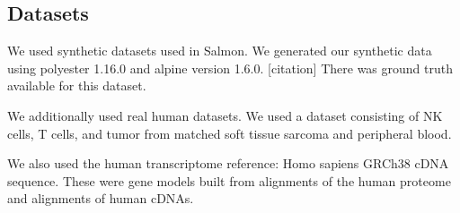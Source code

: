 \subsection{Datasets}
We used synthetic datasets used in Salmon. We generated our synthetic data using polyester 1.16.0 and alpine version 1.6.0. [citation] There was ground truth available for this dataset. 

We additionally used real human datasets. We used a dataset consisting of NK cells, T cells, and tumor from matched soft tissue sarcoma and peripheral blood. 

We also used the human transcriptome reference: Homo sapiens GRCh38 cDNA sequence. These were gene models built from alignments of the human proteome and alignments of human cDNAs. 
